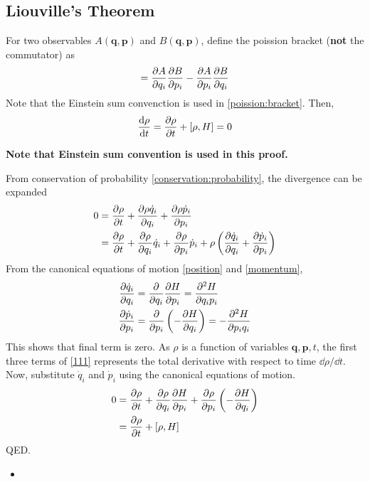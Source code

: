 \documentclass{article}
\newcommand{\ve}{\mathbf}
\begin{document}
\subsection{Liouville's Theorem}
\begin{theorem}
    For two observables $A(\ve q,\ve p)$ and $B(\ve q,\ve p)$, define the poission bracket (\textbf{not} the commutator) as 
    \begin{equation}
        [A,B]=\partialderivative{A}{q_i}\partialderivative{B}{p_i}-\partialderivative{A}{p_i}\partialderivative{B}{q_i}\label{poission:bracket}
    \end{equation}
    Note that the Einstein sum convenction is used in \eqref{poission:bracket}. Then,
    \begin{equation}
        \derivative{\rho}{t}=\partialderivative{\rho}{t}+[\rho,H]=0
    \end{equation}
\end{theorem}
\begin{prooof}
    \textbf{Note that Einstein sum convention is used in this proof.}

    From conservation of probability \eqref{conservation:probability}, the divergence can be expanded
    \begin{align}
        0&=\partialderivative{\rho}{t}+\partialderivative{\rho \dot q_i}{q_i}+\partialderivative{\rho \dot p_i}{p_i}\\
        &=\partialderivative{\rho}{t}+\partialderivative{\rho}{q_i}\dot q_i+\partialderivative{\rho}{p_i}\dot p_i+\rho\left(\partialderivative{\dot q_i}{q_i}+\partialderivative{\dot p_i}{p_i}\right)\label{111}
    \end{align}
    From the canonical equations of motion \eqref{position} and \eqref{momentum}, 
    \begin{align}
        \partialderivative{\dot q_i}{q_i}&=\partialderivative{}{q_i}\partialderivative{H}{p_i}=\partialderivative{^2H}{q_ip_i}\\
        \partialderivative{\dot p_i}{p_i}&=\partialderivative{}{p_i}\left(-\partialderivative{H}{q_i}\right)=-\partialderivative{^2H}{p_iq_i}
    \end{align}
    This shows that final term is zero. As $\rho$ is a function of variables $\ve q,\ve p, t$, the first three terms of \eqref{111} represents the total derivative with respect to time $\dd\rho/\dd t$. Now, substitute $\dot q_i$ and $\dot p_i$ using the canonical equations of motion.
    \begin{align}
        0&=\partialderivative{\rho}{t}+\partialderivative{\rho}{q_i}\partialderivative{H}{p_i}+\partialderivative{\rho}{p_i}\left(-\partialderivative{H}{q_i}\right)\\
        &=\partialderivative{\rho}{t}+[\rho,H]
    \end{align}
    QED.
\end{prooof}
\begin{itemize}
    \item 
\end{itemize}
\end{document}
